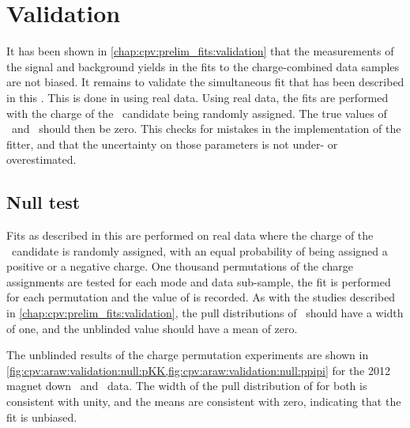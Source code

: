 \section{Validation}
\label{chap:cpv:araw:validation}

It has been shown in \cref{chap:cpv:prelim_fits:validation} that the 
measurements of the signal and background yields in the fits to the 
charge-combined data samples are not biased.
It remains to validate the simultaneous fit that has been described in this 
.
This is done in using real data.
Using real data, the fits are performed with the charge of the \PLambdac\ 
candidate being randomly assigned.
The true values of \ARaw\ and \ARawBg\ should then be zero.
This checks for mistakes in the implementation of the fitter, and that the 
uncertainty on those parameters is not under- or overestimated.

\subsection{Null test}
\label{chap:cpv:araw:validation:null}

Fits as described in this  are performed on real data 
where the charge of the \PLambdac\ candidate is randomly assigned, with an 
equal probability of being assigned a positive or a negative charge.
One thousand permutations of the charge assignments are tested for each mode 
and data sub-sample, the fit is performed for each permutation and the value of 
\ARaw is recorded.
As with the studies described in \cref{chap:cpv:prelim_fits:validation}, the 
pull distributions of \ARaw\ should have a width of one, and the unblinded 
value should have a mean of zero.


The unblinded results of the charge permutation experiments are shown in 
\cref{fig:cpv:araw:validation:null:pKK,fig:cpv:araw:validation:null:ppipi} for 
the 2012 magnet down \pKK\ and \ppipi\ data.
The width of the pull distribution of \ARaw for both is consistent with unity, 
and the means are consistent with zero, indicating that the fit is unbiased.

